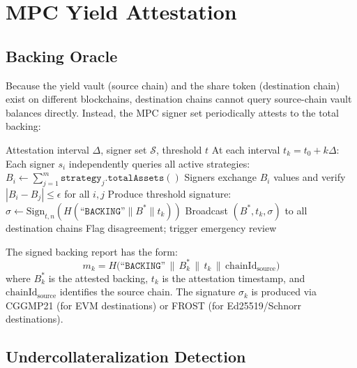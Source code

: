 \section{MPC Yield Attestation}
\label{sec:attestation}

\subsection{Backing Oracle}

Because the yield vault (source chain) and the share token (destination chain) exist on different blockchains, destination chains cannot query source-chain vault balances directly. Instead, the MPC signer set periodically attests to the total backing:

\begin{algorithm}[H]
\caption{MPC Backing Attestation}
\label{alg:attestation}
\begin{algorithmic}[1]
\Require Attestation interval $\Delta$, signer set $\mathcal{S}$, threshold $t$
\State At each interval $t_k = t_0 + k\Delta$:
\State Each signer $s_i$ independently queries all active strategies:
\State \quad $B_i \leftarrow \sum_{j=1}^{m} \texttt{strategy}_j.\texttt{totalAssets}()$
\State Signers exchange $B_i$ values and verify $|B_i - B_j| \leq \epsilon$ for all $i, j$
  \State Produce threshold signature: $\sigma \leftarrow \text{Sign}_{t,n}(H(\texttt{``BACKING''} \| B^* \| t_k))$
  \State Broadcast $(B^*, t_k, \sigma)$ to all destination chains
\Else
  \State Flag disagreement; trigger emergency review
\EndIf
\end{algorithmic}
\end{algorithm}

\begin{definition}
The signed backing report has the form:
\begin{equation}\label{eq:attestation}
  m_k = H\bigl(\texttt{``BACKING''} \,\|\, B^*_k \,\|\, t_k \,\|\, \text{chainId}_{\text{source}}\bigr)
\end{equation}
where $B^*_k$ is the attested backing, $t_k$ is the attestation timestamp, and $\text{chainId}_{\text{source}}$ identifies the source chain. The signature $\sigma_k$ is produced via CGGMP21 (for EVM destinations) or FROST (for Ed25519/Schnorr destinations).
\end{definition}

\subsection{Undercollateralization Detection}

